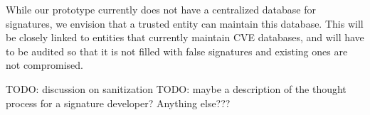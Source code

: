 While our prototype currently does not have a centralized database for signatures, we envision that a trusted entity can maintain this database. This will be closely linked to entities that currently maintain CVE databases, and will have to be audited so that it is not filled with false signatures and existing ones are not compromised.

TODO: discussion on sanitization
TODO: maybe a description of the thought process for a signature developer?
Anything else???